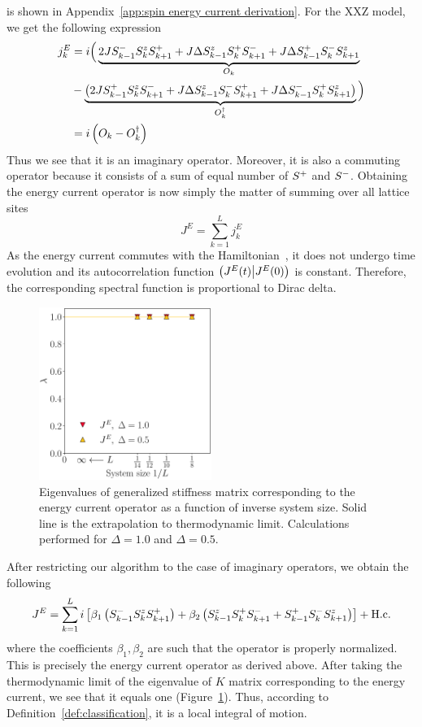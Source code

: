 is shown in Appendix~\ref{app:spin energy current derivation}. For the XXZ model, we get the following expression
\begin{align*}
  j_k^E & = i \Big( \underbrace{2J S^{-}_{k-1}S^{z}_k S^{+}_{k+1} + J \Delta S^{z}_{k-1}S^{+}_k S^{-}_{k+1} + J\Delta S^{+}_{k-1}S^{-}_kS^{z}_{k+1}}_{O_k}                                  \\
        & - \underbrace{\left(2J S^{+}_{k-1}S^{z}_k S^{-}_{k+1} + J\Delta S^{z}_{k-1}S^{-}_k S^{+}_{k+1} + J\Delta S^{-}_{k-1}S^{+}_{k} S^{z}_{k+1} \right)}_{O_k^{\dagger}}\Big) \nonumber \\
        & = i\left(O_k - O_k^{\dagger}\right)
\end{align*}
Thus we see that it is an imaginary operator. Moreover, it is also a commuting operator
because it consists of a sum of equal number of \(S^{+}{}\) and \(S^{-}{}\). 
Obtaining the energy current operator is now simply the matter of summing over all lattice sites
\begin{equation}
  J^E = \sum_{k=1}^L j_k^E
  \label{eq:energy current}
\end{equation}
As the energy current commutes with the Hamiltonian~\autocite{Zotos1997}, it does not undergo time evolution
and its autocorrelation function \(\left(J^E(t) \middle| J^E(0)\right)\) is constant. Therefore, the corresponding
spectral function is proportional to Dirac delta.
\begin{figure}[htbp]
  \centering
  \includegraphics[width=0.5\textwidth]{Figures/current_int.pdf}
  \caption{Eigenvalues of generalized stiffness matrix corresponding to the energy current
  operator as a function of inverse system size. Solid line is the extrapolation to thermodynamic
  limit. Calculations performed for \(\Delta=1.0\) and \(\Delta=0.5\).}\label{fig: current integrable}
\end{figure}
After restricting our algorithm to the case of imaginary
operators, we obtain the following
\begin{equation}
    J^E = \sum_{k=1}^L i\left[\beta_1 \left(S^{-}_{k-1}S^{z}_{k}S^{+}_{k+1}\right) + \beta_2 \left(S^{z}_{k-1}S^{+}_{k}S^{-}_{k+1}+S^{+}_{k-1}S^{-}_{k}S^{z}_{k+1}\right)\right] + \text{H.c.}
\end{equation}
where the coefficients \(\beta_1,\beta_2\) are such that the operator is properly
normalized. This is precisely the energy current operator as derived above.
After taking the thermodynamic limit of the eigenvalue of \(K\) matrix 
corresponding to the energy current, we see that it equals one (Figure~\ref{fig: current integrable}).
Thus, according to Definition~\ref{def:classification}, it is a local integral of motion. 

